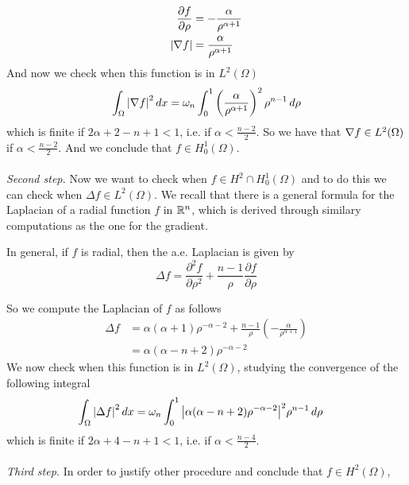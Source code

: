 \begin{align*}
\frac{\partial f}{\partial \rho} &= -\frac{\alpha}{\rho^{\alpha+1}}\\
\abs{\nabla f} &= \frac{\alpha}{\rho^{\alpha+1}}
\end{align*}
And now we check when this function is in \(L^2(\Omega)\)
\begin{align*}
\int_\Omega \abs{\nabla f}^2 \, dx = \omega_n \int_0^1 \left(\frac{\alpha}{\rho^{\alpha+1}}\right)^2 \rho^{n-1}\, d\rho
\end{align*}
which is finite if $2\alpha+2-n+1<1$, i.e. if $\alpha < \frac{n-2}{2}$.
So we have that \(\nabla f \in L^2(\Omega)\) if \(\alpha < \frac{n-2}{2}\).
And we conclude that \(f \in H^1_0(\Omega)\).\\
\vspace{0.1cm}\\
\textit{Second step.} Now we want to check when \(f \in H^2\cap H^1_0(\Omega)\) 
and to do this we can check when \(\Delta f \in L^2(\Omega)\).
We recall that there is a general formula for the Laplacian of a radial function \(f\) in \(\mathbb{R}^n\), 
which is derived through similary computations as the one for the gradient.
\begin{remark}
In general, if \(f\) is radial, then the a.e. Laplacian is given by
\begin{equation*}
\Delta f = \frac{\partial^2 f}{\partial \rho^2} + \frac{n-1}{\rho} \frac{\partial f}{\partial \rho}
\end{equation*}
\end{remark}
So we compute the Laplacian of \(f\) as follows
\begin{align*}
\Delta f &= \alpha (\alpha + 1) \rho^{-\alpha - 2} + \frac{n-1}{\rho} \left(-\frac{\alpha}{\rho^{\alpha + 1}}\right)\\
         &= \alpha (\alpha - n + 2) \rho^{-\alpha - 2}
\end{align*}
We now check when this function is in \(L^2(\Omega)\), studying the convergence of the following integral
\begin{align*}
\int_\Omega \abs{\Delta f}^2 \, dx &= \omega_n \int_0^1 \abs{\alpha (\alpha - n + 2) \rho^{-\alpha - 2}}^2 \rho^{n-1} \, d\rho
\end{align*}
which is finite if \(2\alpha + 4 - n + 1 < 1\), i.e. if \(\alpha < \frac{n-4}{2}\).\\
\vspace{0.1cm}\\
\textit{Third step.} In order to justify other procedure and conclude that $f \in H^2(\Omega)$, 
